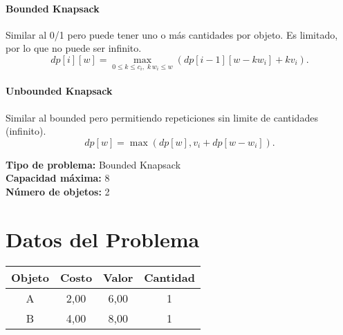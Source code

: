 \documentclass{article}
\begin{document}
\paragraph{Bounded Knapsack} Similar al 0/1 pero puede tener uno o más cantidades por objeto. Es limitado, por lo que no puede ser infinito.
\[
dp[i][w] = 
\max_{0 \leq k \leq c_i,\; k\,w_i \leq w} \left( dp[i-1][w - k w_i] + k v_i \right).
\]

\paragraph{Unbounded Knapsack} Similar al bounded pero permitiendo repeticiones sin limite de cantidades (infinito).
\[
dp[w] = \max ( dp[w], v_i + dp[w - w_i] ).
\]

\thispagestyle{empty}
\newpage
\textbf{Tipo de problema:} Bounded Knapsack\\
\textbf{Capacidad máxima:} 8\\
\textbf{Número de objetos:} 2\\

\section*{Datos del Problema}
\begin{tabular}{|c|c|c|c|}
\hline
Objeto & Costo & Valor & Cantidad \\
\hline
A & 2,00 & 6,00 & 1 \\
B & 4,00 & 8,00 & 1 \\
\hline
\end{tabular}
\end{document}
